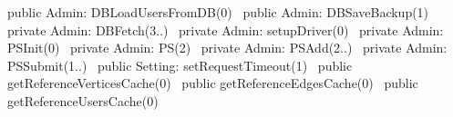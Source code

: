 public \LA{}Admin: DBLoadUsersFromDB(0)~{\nwtagstyle{}}\RA{}
public \LA{}Admin: DBSaveBackup(1)~{\nwtagstyle{}}\RA{}
private \LA{}Admin: DBFetch(3..)~{\nwtagstyle{}}\RA{}
private \LA{}Admin: setupDriver(0)~{\nwtagstyle{}}\RA{}
private \LA{}Admin: PSInit(0)~{\nwtagstyle{}}\RA{}
private \LA{}Admin: PS(2)~{\nwtagstyle{}}\RA{}
private \LA{}Admin: PSAdd(2..)~{\nwtagstyle{}}\RA{}
private \LA{}Admin: PSSubmit(1..)~{\nwtagstyle{}}\RA{}
public \LA{}Setting: setRequestTimeout(1)~{\nwtagstyle{}}\RA{}
public \LA{}getReferenceVerticesCache(0)~{\nwtagstyle{}}\RA{}
public \LA{}getReferenceEdgesCache(0)~{\nwtagstyle{}}\RA{}
public \LA{}getReferenceUsersCache(0)~{\nwtagstyle{}}\RA{}
\nwendcode{}\nwdocspar

